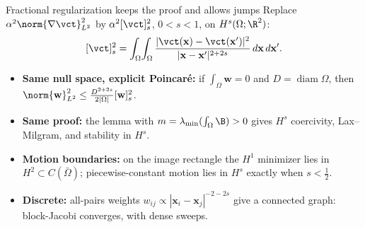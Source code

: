 \begin{frame}[label=fractional]{Fractional regularization keeps the proof and allows jumps}
\small
Replace $\alpha^2\norm{\nabla\vct}_{L^2}^2$ by $\alpha^2[\vct]_s^2$, $0<s<1$, on $H^s(\Omega;\R^2)$:
\[[\vct]_s^2=\int_\Omega\!\int_\Omega\frac{|\vct(\mathbf x)-\vct(\mathbf x')|^2}{|\mathbf x-\mathbf x'|^{2+2s}}\,d\mathbf x\,d\mathbf x'.\]
\vspace{-3mm}
\begin{itemize}\setlength{\itemsep}{0pt}
\item \textbf{Same null space, explicit Poincar\'e:} if $\int_\Omega\mathbf w=0$ and $D=\operatorname{diam}\Omega$, then $\norm{\mathbf w}_{L^2}^2\le\frac{D^{2+2s}}{2|\Omega|}[\mathbf w]_s^2$.
\item \textbf{Same proof:} the lemma with $m=\lambda_{\min}(\int_\Omega\B)>0$ gives $H^s$ coercivity, Lax--Milgram, and stability in $H^s$.
\item \textbf{Motion boundaries:} on the image rectangle the $H^1$ minimizer lies in $H^2\subset C(\bar\Omega)$; piecewise-constant motion lies in $H^s$ exactly when $s<\tfrac12$.
\item \textbf{Discrete:} all-pairs weights $w_{ij}\propto|\mathbf x_i-\mathbf x_j|^{-2-2s}$ give a connected graph: block-Jacobi converges, with dense sweeps.
\end{itemize}

\end{frame}
